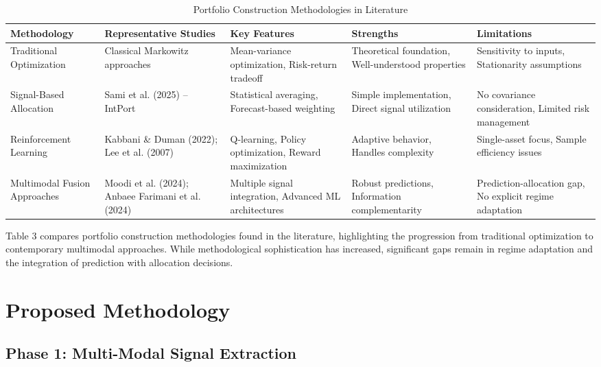 \documentclass{singlecol-new}
\theoremstyle{TH}{
\newtheorem{lemma}{Lemma}
\newtheorem{theorem}[lemma]{Theorem}
\newtheorem{corrolary}[lemma]{Corrolary}
\newtheorem{conjecture}[lemma]{Conjecture}
\newtheorem{proposition}[lemma]{Proposition}
\newtheorem{claim}[lemma]{Claim}
\newtheorem{stheorem}[lemma]{Wrong Theorem}
\newtheorem{algorithm}{Algorithm}
}
\theoremstyle{THrm}{
\newtheorem{definition}{Definition}[section]
\newtheorem{question}{Question}[section]
\newtheorem{remark}{Remark}
\newtheorem{scheme}{Scheme}
}
\theoremstyle{THhit}{
\newtheorem{case}{Case}[section]
}
\begin{document}
\begin{table}[!ht]
\centering
\caption{Portfolio Construction Methodologies in Literature}
\label{tab:portfolio_methodologies}
\small
\begin{tabular}{p{2cm}p{2cm}p{2cm}p{2cm}p{2cm}}
\hline
\textbf{Methodology} & \textbf{Representative Studies} & \textbf{Key Features} & \textbf{Strengths} & \textbf{Limitations} \\
\hline
Traditional Optimization & Classical Markowitz approaches & Mean-variance optimization, Risk-return tradeoff & Theoretical foundation, Well-understood properties & Sensitivity to inputs, Stationarity assumptions \\
\hline
Signal-Based Allocation & Sami et al. (2025) -- IntPort & Statistical averaging, Forecast-based weighting & Simple implementation, Direct signal utilization & No covariance consideration, Limited risk management \\
\hline
Reinforcement Learning & Kabbani \& Duman (2022); Lee et al. (2007) & Q-learning, Policy optimization, Reward maximization & Adaptive behavior, Handles complexity & Single-asset focus, Sample efficiency issues \\
\hline
Multimodal Fusion Approaches & Moodi et al. (2024); Anbaee Farimani et al. (2024) & Multiple signal integration, Advanced ML architectures & Robust predictions, Information complementarity & Prediction-allocation gap, No explicit regime adaptation \\
\hline
\end{tabular}
\end{table}
Table 3 compares portfolio construction methodologies found in the literature, highlighting the progression from traditional optimization to contemporary multimodal approaches. While methodological sophistication has increased, significant gaps remain in regime adaptation and the integration of prediction with allocation decisions.




\section{Proposed Methodology} 





\subsection{Phase 1: Multi-Modal Signal Extraction}
\end{document}
